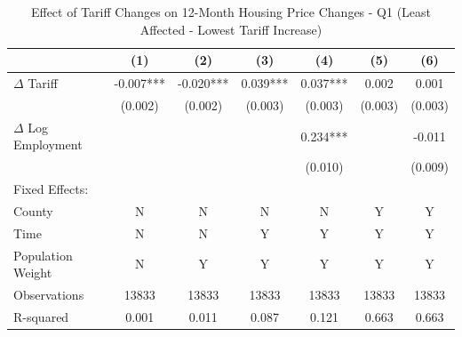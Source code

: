 \begin{table}[htbp]
\centering
\caption{Effect of Tariff Changes on 12-Month Housing Price Changes - Q1 (Least Affected - Lowest Tariff Increase)}
\label{tab:tariffs_changes_q1}
\begin{tabular}{lcccccc}
\toprule
{} &       (1) &      (2) &       (3) &       (4) &       (5) &        (6) \\
\midrule
$\Delta$ Tariff  &  -0.007*** & -0.020*** &  0.039*** &  0.037*** &     0.002 &      0.001 \\
                 &    (0.002) &   (0.002) &   (0.003) &   (0.003) &   (0.003) &    (0.003) \\
$\Delta$ Log Employment &           &           &           &  0.234*** &           &     -0.011 \\
                 &           &           &           &   (0.010) &           &    (0.009) \\
Fixed Effects:   &           &          &           &           &           &            \\
County           &         N &        N &         N &         N &         Y &          Y \\
Time             &         N &        N &         Y &         Y &         Y &          Y \\
Population Weight &        N &        Y &         Y &         Y &         Y &          Y \\
\midrule
Observations     &     13833 &     13833 &     13833 &     13833 &     13833 &      13833 \\
R-squared        &     0.001 &     0.011 &     0.087 &     0.121 &     0.663 &      0.663 \\
\bottomrule
\end{tabular}
\end{table}